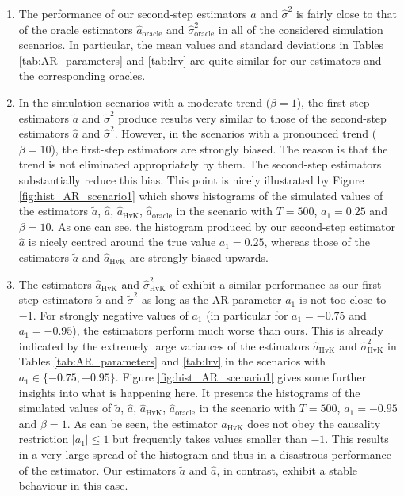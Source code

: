 \begin{enumerate}[label=(\roman*),leftmargin=0.9cm]

\item The performance of our second-step estimators $\widehat{a}$ and $\widehat{\sigma}^2$ is fairly close to that of the oracle estimators $\widehat{a}_{\text{oracle}}$ and $\widehat{\sigma}^2_{\text{oracle}}$ in all of the considered simulation scenarios. In particular, the mean values and standard deviations in Tables \ref{tab:AR_parameters} and \ref{tab:lrv} are quite similar for our estimators and the corresponding oracles. 

\item In the simulation scenarios with a moderate trend ($\beta = 1$), the first-step estimators $\widetilde{a}$ and $\widetilde{\sigma}^2$ produce results very similar to those of the second-step estimators $\widehat{a}$ and $\widehat{\sigma}^2$. However, in the scenarios with a pronounced trend ($\beta = 10$), the first-step estimators are strongly biased. The reason is that the trend is not eliminated appropriately by them. The second-step estimators substantially reduce this bias. This point is nicely illustrated by Figure \ref{fig:hist_AR_scenario1} which shows histograms of the simulated values of the estimators $\widetilde{a}$, $\widehat{a}$, $\widehat{a}_{\text{HvK}}$, $\widehat{a}_{\text{oracle}}$ in the scenario with $T=500$, $a_1=0.25$ and $\beta = 10$. As one can see, the histogram produced by our second-step estimator $\widehat{a}$ is nicely centred around the true value $a_1 = 0.25$, whereas those of the estimators $\widetilde{a}$ and $\widehat{a}_{\text{HvK}}$ are strongly biased upwards. 

\item The estimators $\widehat{a}_{\text{HvK}}$ and $\widehat{\sigma}^2_{\text{HvK}}$ of \cite{Hall2003} exhibit a similar performance as our first-step estimators $\widetilde{a}$ and $\widetilde{\sigma}^2$ as long as the AR parameter $a_1$ is not too close to $-1$. For strongly negative values of $a_1$ (in particular for $a_1 = -0.75$ and $a_1 = -0.95$), the estimators perform much worse than ours. This is already indicated by the extremely large variances of the estimators $\widehat{a}_{\text{HvK}}$ and $\widehat{\sigma}^2_{\text{HvK}}$ in Tables \ref{tab:AR_parameters} and \ref{tab:lrv} in the scenarios with $a_1 \in \{-0.75,-0.95\}$. Figure \ref{fig:hist_AR_scenario1} gives some further insights into what is happening here. It presents the histograms of the simulated values of $\widetilde{a}$, $\widehat{a}$, $\widehat{a}_{\text{HvK}}$, $\widehat{a}_{\text{oracle}}$ in the scenario with $T=500$, $a_1=-0.95$ and $\beta = 1$. As can be seen, the estimator $\widehat{a}_{\text{HvK}}$ does not obey the causality restriction $|a_1| \le 1$ but frequently takes values smaller than $-1$. This results in a very large spread of the histogram and thus in a disastrous performance of the estimator. Our estimators $\widetilde{a}$ and $\widehat{a}$, in contrast, exhibit a stable behaviour in this case.
\end{enumerate}



